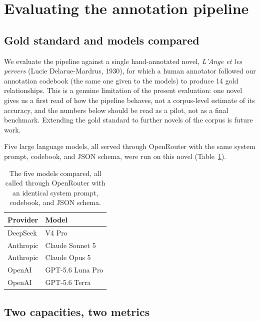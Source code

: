 \section{Evaluating the annotation pipeline}
\label{sec:evaluation}

\subsection{Gold standard and models compared}

We evaluate the pipeline against a single hand-annotated novel,
\emph{L'Ange et les pervers} (Lucie Delarue-Mardrus, 1930), for which a human annotator
followed our annotation codebook (the same one given to the models) to produce 14 gold
relationships. This is a genuine limitation of the present evaluation: one novel gives us
a first read of how the pipeline behaves, not a corpus-level estimate of its accuracy, and
the numbers below should be read as a pilot, not as a final benchmark. Extending the gold
standard to further novels of the corpus is future work.

Five large language models, all served through OpenRouter with the same system prompt,
codebook, and JSON schema, were run on this novel (Table~\ref{tab:models}).

\begin{table}[h]
  \centering
  \small
  \begin{tabular}{ll}
    \toprule
    Provider & Model \\
    \midrule
    DeepSeek  & V4 Pro \\
    Anthropic & Claude Sonnet 5 \\
    Anthropic & Claude Opus 5 \\
    OpenAI    & GPT-5.6 Luna Pro \\
    OpenAI    & GPT-5.6 Terra \\
    \bottomrule
  \end{tabular}
  \caption{The five models compared, all called through OpenRouter with an identical
  system prompt, codebook, and JSON schema.}
  \label{tab:models}
\end{table}

\subsection{Two capacities, two metrics}

